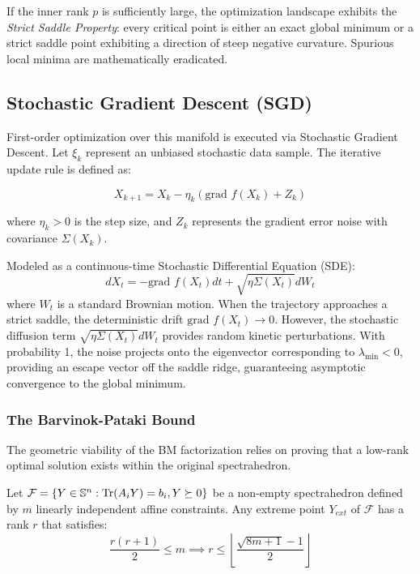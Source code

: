 If the inner rank $p$ is sufficiently large, the optimization landscape exhibits the \textit{Strict Saddle Property}: every critical point is either an exact global minimum or a strict saddle point exhibiting a direction of steep negative curvature. Spurious local minima are mathematically eradicated.

\subsection{Stochastic Gradient Descent (SGD)}

First-order optimization over this manifold is executed via Stochastic Gradient Descent. Let $\xi_k$ represent an unbiased stochastic data sample. The iterative update rule is defined as:

\begin{equation}
X_{k+1} = X_k - \eta_k \left( \text{grad } f(X_k) + Z_k \right)
\end{equation}

where $\eta_k > 0$ is the step size, and $Z_k$ represents the gradient error noise with covariance $\Sigma(X_k)$. 

Modeled as a continuous-time Stochastic Differential Equation (SDE):
\begin{equation}
dX_t = -\text{grad } f(X_t) dt + \sqrt{\eta \Sigma(X_t)} dW_t
\end{equation}
where $W_t$ is a standard Brownian motion. When the trajectory approaches a strict saddle, the deterministic drift $\text{grad } f(X_t) \to 0$. However, the stochastic diffusion term $\sqrt{\eta \Sigma(X_t)} dW_t$ provides random kinetic perturbations. With probability 1, the noise projects onto the eigenvector corresponding to $\lambda_{\min} < 0$, providing an escape vector off the saddle ridge, guaranteeing asymptotic convergence to the global minimum.

\subsubsection{The Barvinok-Pataki Bound}
The geometric viability of the BM factorization relies on proving that a low-rank optimal solution exists within the original spectrahedron.

\begin{theorem}
Let $\mathcal{F} = \{ Y \in \mathbb{S}^n : \mathrm{Tr}(A_i Y) = b_i, Y \succeq 0 \}$ be a non-empty spectrahedron defined by $m$ linearly independent affine constraints. Any extreme point $Y_{ext}$ of $\mathcal{F}$ has a rank $r$ that satisfies:
\begin{equation}
\frac{r(r+1)}{2} \le m \implies r \le \left\lfloor \frac{\sqrt{8m+1}-1}{2} \right\rfloor
\label{eq:pataki_bound}
\end{equation}
\end{theorem}

